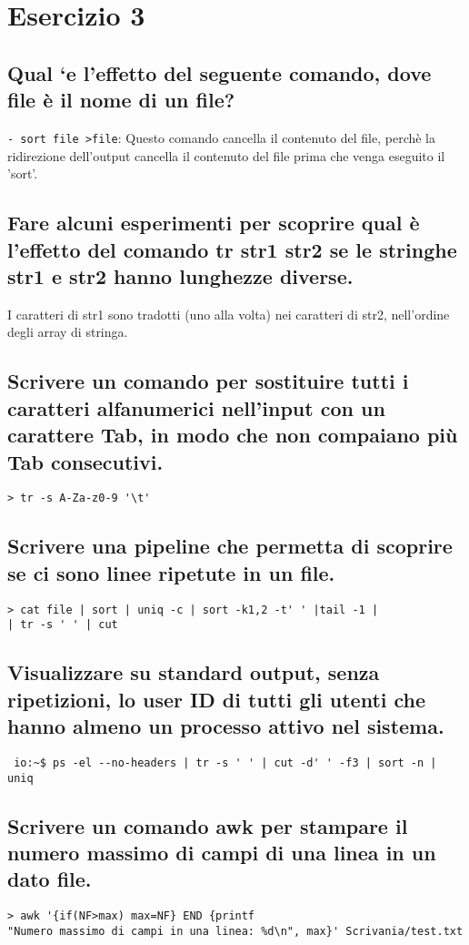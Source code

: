 \section{Esercizio 3}

\subsection{Qual `e l’effetto del seguente comando, dove file
\`e il nome di un file?}
\verb:- sort file >file:: Questo comando cancella il contenuto del file, perchè
la ridirezione dell'output cancella il contenuto del file prima che venga
eseguito il 'sort'. \\

\subsection{Fare alcuni esperimenti per scoprire qual \`e l’effetto del comando
tr str1 str2 se le stringhe str1 e str2 hanno lunghezze diverse.}
I caratteri di str1 sono tradotti (uno alla volta) nei caratteri di str2,
nell'ordine degli array di stringa. \\


\subsection{Scrivere un comando per sostituire tutti i caratteri alfanumerici
nell’input con un carattere Tab, in modo che non compaiano pi\`u Tab consecutivi.}
\verb:> tr -s A-Za-z0-9 '\t': \\


\subsection{Scrivere una pipeline che permetta di scoprire se ci sono linee ripetute in un file.}
\verb:> cat file | sort | uniq -c | sort -k1,2 -t' ' |tail -1 |: \\
\verb:| tr -s ' ' | cut: \\


\subsection{Visualizzare su standard output, senza ripetizioni, lo user ID di tutti gli utenti che hanno almeno un processo attivo nel sistema.}
\verb. io:~$ ps -el --no-headers | tr -s ' ' | cut -d' ' -f3 | sort -n | uniq.
\\


\subsection{Scrivere un comando awk per stampare il numero massimo di campi di una linea in un dato file.}
\verb.> awk '{if(NF>max) max=NF} END {printf. \\
\verb-"Numero massimo di campi in una linea: %d\n", max}' Scrivania/test.txt- \\

